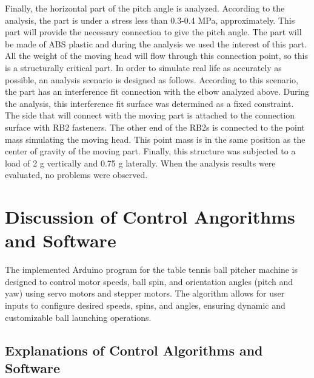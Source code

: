 \documentclass[12pt]{report}
\begin{document}
Finally, the horizontal part of the pitch angle is analyzed. According to the analysis, the part is under a stress less than 0.3-0.4 MPa, approximately. 
This part will provide the necessary connection to give the pitch angle. The part will be made of ABS plastic and during the analysis we used the interest of this part. All the weight of the moving head will flow through this connection point, so this is a structurally critical part. In order to simulate real life as accurately as possible, an analysis scenario is designed as follows. According to this scenario, the part has an interference fit connection with the elbow analyzed above. During the analysis, this interference fit surface was determined as a fixed constraint. The side that will connect with the moving part is attached to the connection surface with RB2 fasteners. The other end of the RB2s is connected to the point mass simulating the moving head. This point mass is in the same position as the center of gravity of the moving part. Finally, this structure was subjected to a load of 2 g vertically and 0.75 g laterally. When the analysis results were evaluated, no problems were observed.

\section{Discussion of Control Angorithms and Software}

The implemented Arduino program for the table tennis ball pitcher machine is designed to control motor speeds, ball spin, and orientation angles (pitch and yaw) using servo motors and stepper motors. The algorithm allows for user inputs to configure desired speeds, spins, and angles, ensuring dynamic and customizable ball launching operations.

\subsection{Explanations of Control Algorithms and Software}
\end{document}
